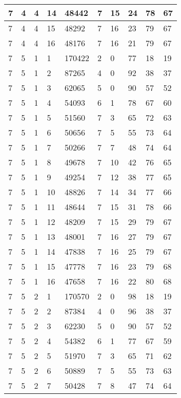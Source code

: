 \begin{table}[!ht]
\begin{tabular}{|l|l|l|l|l|l|l|l|l|l|}
        7 & 4 & 4 & 14 & 48442 & 7 & 15 & 24 & 78 & 67 \\ \hline
        7 & 4 & 4 & 15 & 48292 & 7 & 16 & 23 & 79 & 67 \\ \hline
        7 & 4 & 4 & 16 & 48176 & 7 & 16 & 21 & 79 & 67 \\ \hline
        7 & 5 & 1 & 1 & 170422 & 2 & 0 & 77 & 18 & 19 \\ \hline
        7 & 5 & 1 & 2 & 87265 & 4 & 0 & 92 & 38 & 37 \\ \hline
        7 & 5 & 1 & 3 & 62065 & 5 & 0 & 90 & 57 & 52 \\ \hline
        7 & 5 & 1 & 4 & 54093 & 6 & 1 & 78 & 67 & 60 \\ \hline
        7 & 5 & 1 & 5 & 51560 & 7 & 3 & 65 & 72 & 63 \\ \hline
        7 & 5 & 1 & 6 & 50656 & 7 & 5 & 55 & 73 & 64 \\ \hline
        7 & 5 & 1 & 7 & 50266 & 7 & 7 & 48 & 74 & 64 \\ \hline
        7 & 5 & 1 & 8 & 49678 & 7 & 10 & 42 & 76 & 65 \\ \hline
        7 & 5 & 1 & 9 & 49254 & 7 & 12 & 38 & 77 & 65 \\ \hline
        7 & 5 & 1 & 10 & 48826 & 7 & 14 & 34 & 77 & 66 \\ \hline
        7 & 5 & 1 & 11 & 48644 & 7 & 15 & 31 & 78 & 66 \\ \hline
        7 & 5 & 1 & 12 & 48209 & 7 & 15 & 29 & 79 & 67 \\ \hline
        7 & 5 & 1 & 13 & 48001 & 7 & 16 & 27 & 79 & 67 \\ \hline
        7 & 5 & 1 & 14 & 47838 & 7 & 16 & 25 & 79 & 67 \\ \hline
        7 & 5 & 1 & 15 & 47778 & 7 & 16 & 23 & 79 & 68 \\ \hline
        7 & 5 & 1 & 16 & 47658 & 7 & 16 & 22 & 80 & 68 \\ \hline
        7 & 5 & 2 & 1 & 170570 & 2 & 0 & 98 & 18 & 19 \\ \hline
        7 & 5 & 2 & 2 & 87384 & 4 & 0 & 96 & 38 & 37 \\ \hline
        7 & 5 & 2 & 3 & 62230 & 5 & 0 & 90 & 57 & 52 \\ \hline
        7 & 5 & 2 & 4 & 54382 & 6 & 1 & 77 & 67 & 59 \\ \hline
        7 & 5 & 2 & 5 & 51970 & 7 & 3 & 65 & 71 & 62 \\ \hline
        7 & 5 & 2 & 6 & 50889 & 7 & 5 & 55 & 73 & 63 \\ \hline
        7 & 5 & 2 & 7 & 50428 & 7 & 8 & 47 & 74 & 64 \\ \hline

\end{tabular}
\end{table}
